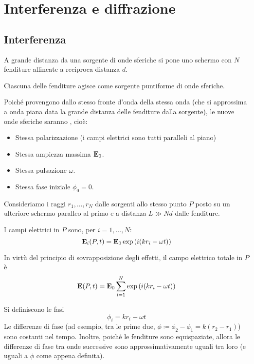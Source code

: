 \chapter{Interferenza e diffrazione}

\section{Interferenza}

A grande distanza da una sorgente di onde sferiche si pone uno schermo con $N$ fenditure allineate a reciproca distanza $d$.

Ciascuna delle fenditure agisce come sorgente puntiforme di onde sferiche.

Poiché provengono dallo stesso fronte d'onda della stessa onda (che si approssima a onda piana data la grande distanza delle fenditure dalla sorgente), le nuove onde sferiche saranno , cioè:
\begin{itemize}
    \item Stessa polarizzazione (i campi elettrici sono tutti paralleli al piano)
    \item Stessa ampiezza massima $\mathbf{E}_0$.
    \item Stessa pulsazione $\omega$.
    \item Stessa fase iniziale $\phi_0 = 0$.
\end{itemize}

Consideriamo i raggi $r_1, \ldots, r_N$ dalle sorgenti allo stesso punto $P$ posto su un ulteriore schermo paralleo al primo e a distanza $L \gg N d$ dalle fenditure.

I campi elettrici in $P$ sono, per $i = 1, \ldots, N$:
\begin{equation}
    \mathbf{E}_i(P, t) = \mathbf{E}_0 \operatorname{exp}\left( i (k r_i - \omega t) \right)
\end{equation}

In virtù del principio di sovrapposizione degli effetti, il campo elettrico totale in $P$ è
\begin{equation}
    \mathbf{E}(P, t) = \mathbf{E}_0 \sum_{i = 1}^N \operatorname{exp}\left( i (k r_i - \omega t) \right)
\end{equation}

Si definiscono le fasi
\begin{equation}
    \phi_i = k r_i - \omega t
\end{equation}
Le differenze di fase (ad esempio, tra le prime due, $\phi \coloneq \phi_2 - \phi_1 = k(r_2 - r_1)$) sono costanti nel tempo.
Inoltre, poiché le fenditure sono equispaziate, allora le differenze di fase tra onde successive sono approssimativamente uguali tra loro (e uguali a $\phi$ come appena definita).


